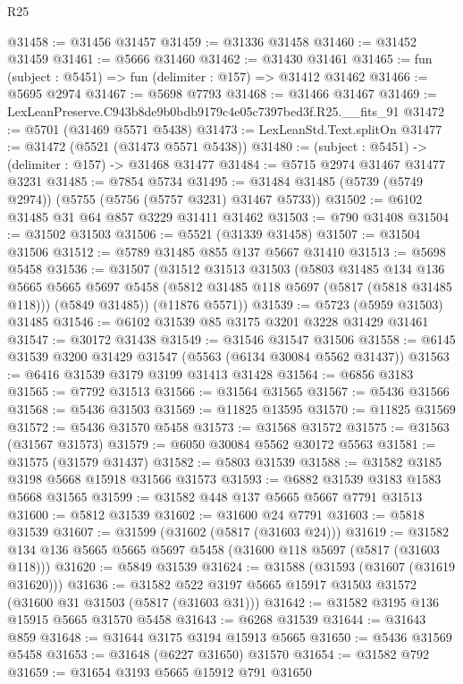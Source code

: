 \begin{lexlean}{R25}
\begin{coremodule}
@31458 := @31456 @31457
@31459 := @31336 @31458
@31460 := @31452 @31459
@31461 := @5666 @31460
@31462 := @31430 @31461
@31465 := fun (subject : @5451) => fun (delimiter : @157) => @31412 @31462
@31466 := @5695 @2974
@31467 := @5698 @7793
@31468 := @31466 @31467
@31469 := LexLeanPreserve.C943b8de9b0bdb9179c4e05c7397bed3f.R25.__fits_91
@31472 := @5701 (@31469 @5571 @5438)
@31473 := LexLeanStd.Text.splitOn
@31477 := @31472 (@5521 (@31473 @5571 @5438))
@31480 := (subject : @5451) -> (delimiter : @157) -> @31468 @31477
@31484 := @5715 @2974 @31467 @31477 @3231
@31485 := @7854 @5734
@31495 := @31484 @31485 (@5739 (@5749 @2974)) (@5755 (@5756 (@5757 @3231) @31467 @5733))
@31502 := @6102 @31485 @31 @64 @857 @3229 @31411 @31462
@31503 := @790 @31408
@31504 := @31502 @31503
@31506 := @5521 (@31339 @31458)
@31507 := @31504 @31506
@31512 := @5789 @31485 @855 @137 @5667 @31410
@31513 := @5698 @5458
@31536 := @31507
    (@31512
      @31513
      @31503
      (@5803
        @31485
        @134
        @136
        @5665
        @5665
        @5697
        @5458
        (@5812 @31485 @118 @5697 (@5817 (@5818 @31485 @118)))
        (@5849 @31485))
      (@11876 @5571))
@31539 := @5723 (@5959 @31503) @31485
@31546 := @6102 @31539 @85 @3175 @3201 @3228 @31429 @31461
@31547 := @30172 @31438
@31549 := @31546 @31547 @31506
@31558 := @6145 @31539 @3200 @31429 @31547 (@5563 (@6134 @30084 @5562 @31437))
@31563 := @6416 @31539 @3179 @3199 @31413 @31428
@31564 := @6856 @3183
@31565 := @7792 @31513
@31566 := @31564 @31565
@31567 := @5436 @31566
@31568 := @5436 @31503
@31569 := @11825 @13595
@31570 := @11825 @31569
@31572 := @5436 @31570 @5458
@31573 := @31568 @31572
@31575 := @31563 (@31567 @31573)
@31579 := @6050 @30084 @5562 @30172 @5563
@31581 := @31575 (@31579 @31437)
@31582 := @5803 @31539
@31588 := @31582 @3185 @3198 @5668 @15918 @31566 @31573
@31593 := @6882 @31539 @3183 @1583 @5668 @31565
@31599 := @31582 @448 @137 @5665 @5667 @7791 @31513
@31600 := @5812 @31539
@31602 := @31600 @24 @7791
@31603 := @5818 @31539
@31607 := @31599 (@31602 (@5817 (@31603 @24)))
@31619 := @31582 @134 @136 @5665 @5665 @5697 @5458 (@31600 @118 @5697 (@5817 (@31603 @118)))
@31620 := @5849 @31539
@31624 := @31588 (@31593 (@31607 (@31619 @31620)))
@31636 := @31582 @522 @3197 @5665 @15917 @31503 @31572 (@31600 @31 @31503 (@5817 (@31603 @31)))
@31642 := @31582 @3195 @136 @15915 @5665 @31570 @5458
@31643 := @6268 @31539
@31644 := @31643 @859
@31648 := @31644 @3175 @3194 @15913 @5665
@31650 := @5436 @31569 @5458
@31653 := @31648 (@6227 @31650) @31570
@31654 := @31582 @792
@31659 := @31654 @3193 @5665 @15912 @791 @31650

\end{coremodule}
\end{lexlean}
